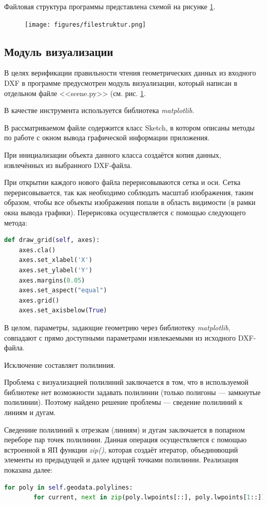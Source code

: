 Файловая структура программы представлена схемой на рисунке \ref{fig:filestruktur}.

\begin{figure}[H]
	\centering
	\texttt{[image: figures/filestruktur.png]}
	\label{fig:filestruktur}
\end{figure}

\subsection{Модуль визуализации}

В целях верификации правильности чтения геометрических данных из входного DXF в программе предусмотрен модуль визуализации, который написан в отдельном файле <<scene.py>> (см. рис. \ref{fig:filestruktur}.

В качестве инструмента используется библиотека \textit{matplotlib}.

В рассматриваемом файле содержится класс Sketch, в котором описаны методы по работе с окном вывода графической информации приложения.

При инициализации объекта данного класса создаётся копия данных, извлечённых из выбранного DXF-файла.

При открытии каждого нового файла перерисовываются сетка и оси. Сетка перерисовывается, так как необходимо соблюдать масштаб изображения, таким образом, чтобы все объекты изображения попали в область видимости (в рамки окна вывода графики). Перерисовка осуществляется с помощью следующего метода:
\begin{lstlisting}[language=python,label=list:redraw]
def draw_grid(self, axes):
	axes.cla()
	axes.set_xlabel('X')
	axes.set_ylabel('Y')
	axes.margins(0.05)
	axes.set_aspect("equal")
	axes.grid()
	axes.set_axisbelow(True)
\end{lstlisting}

В целом, параметры, задающие геометрию через библиотеку \textit{matplotlib}, совпадают с прямо доступными параметрами извлекаемыми из исходного DXF-файла.

Исключение составляет полилиния.

Проблема с визуализацией полилиний заключается в том, что в используемой библиотеке нет возможности задавать полилинии (только полигоны --- замкнутые полилинии). Поэтому найдено решение проблемы --- сведение полилиний к линиям и дугам.

Сведениие полилиний к отрезкам (линиям) и дугам заключается в попарном переборе пар точек полилинии. Данная операция осуществляется с помощью встроенной в ЯП функции \textit{zip()}, которая создаёт итератор, объединяющий элементы из предыдущей и далее идущей точками полилинии. Реализация показана далее:
\begin{lstlisting}[language=python,label=list:redraw]
	for poly in self.geodata.polylines:
		for current, next in zip(poly.lwpoints[::], poly.lwpoints[1::]):
\end{lstlisting}

